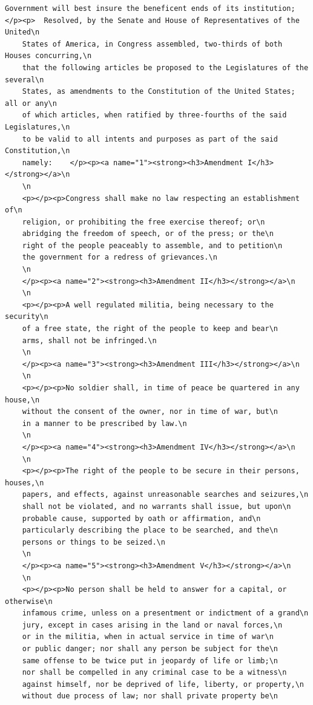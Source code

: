 \documentclass[a4paper,11pt,final]{report}
\begin{document}
\begin{lstlisting}[breaklines]
    Government will best insure the beneficent ends of its institution; </p><p>  Resolved, by the Senate and House of Representatives of the United\n
    States of America, in Congress assembled, two-thirds of both Houses concurring,\n
    that the following articles be proposed to the Legislatures of the several\n
    States, as amendments to the Constitution of the United States; all or any\n
    of which articles, when ratified by three-fourths of the said Legislatures,\n
    to be valid to all intents and purposes as part of the said Constitution,\n
    namely:    </p><p><a name="1"><strong><h3>Amendment I</h3></strong></a>\n
    \n
    <p></p><p>Congress shall make no law respecting an establishment of\n
    religion, or prohibiting the free exercise thereof; or\n
    abridging the freedom of speech, or of the press; or the\n
    right of the people peaceably to assemble, and to petition\n
    the government for a redress of grievances.\n
    \n
    </p><p><a name="2"><strong><h3>Amendment II</h3></strong></a>\n
    \n
    <p></p><p>A well regulated militia, being necessary to the security\n
    of a free state, the right of the people to keep and bear\n
    arms, shall not be infringed.\n
    \n
    </p><p><a name="3"><strong><h3>Amendment III</h3></strong></a>\n
    \n
    <p></p><p>No soldier shall, in time of peace be quartered in any house,\n
    without the consent of the owner, nor in time of war, but\n
    in a manner to be prescribed by law.\n
    \n
    </p><p><a name="4"><strong><h3>Amendment IV</h3></strong></a>\n
    \n
    <p></p><p>The right of the people to be secure in their persons, houses,\n
    papers, and effects, against unreasonable searches and seizures,\n
    shall not be violated, and no warrants shall issue, but upon\n
    probable cause, supported by oath or affirmation, and\n
    particularly describing the place to be searched, and the\n
    persons or things to be seized.\n
    \n
    </p><p><a name="5"><strong><h3>Amendment V</h3></strong></a>\n
    \n
    <p></p><p>No person shall be held to answer for a capital, or otherwise\n
    infamous crime, unless on a presentment or indictment of a grand\n
    jury, except in cases arising in the land or naval forces,\n
    or in the militia, when in actual service in time of war\n
    or public danger; nor shall any person be subject for the\n
    same offense to be twice put in jeopardy of life or limb;\n
    nor shall be compelled in any criminal case to be a witness\n
    against himself, nor be deprived of life, liberty, or property,\n
    without due process of law; nor shall private property be\n

\end{lstlisting}
\end{document}
